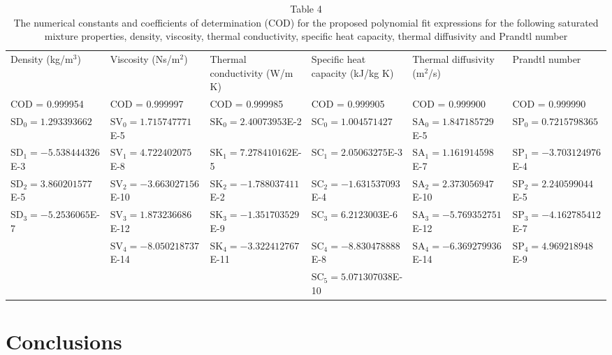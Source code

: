 \documentclass[11pt]{article}
\begin{document}
\begin{landscape}
\begin{table}[htbp]
\centering
\scriptsize
\caption*{Table 4\\ The numerical constants and coefficients of
determination (COD) for the proposed polynomial fit expressions for the
following saturated mixture properties, density, viscosity, thermal
conductivity, specific heat capacity, thermal diffusivity and Prandtl
number}
\setlength{\tabcolsep}{3pt}
\begin{tabular}{llllll}
\toprule
Density (kg/m$^3$) & Viscosity (Ns/m$^2$)
 & Thermal conductivity (W/m K) & Specific heat capacity (kJ/kg K)
 & Thermal diffusivity (m$^2$/s) & Prandtl number \\
COD = 0.999954 & COD = 0.999997 & COD = 0.999985
 & COD = 0.999905 & COD = 0.999900 & COD = 0.999990 \\
\midrule
$\mathrm{SD}_0 = 1.293393662$
 & $\mathrm{SV}_0 = 1.715747771$E-5
 & $\mathrm{SK}_0 = 2.40073953$E-2
 & $\mathrm{SC}_0 = 1.004571427$
 & $\mathrm{SA}_0 = 1.847185729$E-5
 & $\mathrm{SP}_0 = 0.7215798365$ \\
$\mathrm{SD}_1 = -5.538444326$E-3
 & $\mathrm{SV}_1 = 4.722402075$E-8
 & $\mathrm{SK}_1 = 7.278410162$E-5
 & $\mathrm{SC}_1 = 2.05063275$E-3
 & $\mathrm{SA}_1 = 1.161914598$E-7
 & $\mathrm{SP}_1 = -3.703124976$E-4 \\
$\mathrm{SD}_2 = 3.860201577$E-5
 & $\mathrm{SV}_2 = -3.663027156$E-10
 & $\mathrm{SK}_2 = -1.788037411$E-2
 & $\mathrm{SC}_2 = -1.631537093$E-4
 & $\mathrm{SA}_2 = 2.373056947$E-10
 & $\mathrm{SP}_2 = 2.240599044$E-5 \\
$\mathrm{SD}_3 = -5.2536065$E-7
 & $\mathrm{SV}_3 = 1.873236686$E-12
 & $\mathrm{SK}_3 = -1.351703529$E-9
 & $\mathrm{SC}_3 = 6.2123003$E-6
 & $\mathrm{SA}_3 = -5.769352751$E-12
 & $\mathrm{SP}_3 = -4.162785412$E-7 \\
 & $\mathrm{SV}_4 = -8.050218737$E-14
 & $\mathrm{SK}_4 = -3.322412767$E-11
 & $\mathrm{SC}_4 = -8.830478888$E-8
 & $\mathrm{SA}_4 = -6.369279936$E-14
 & $\mathrm{SP}_4 = 4.969218948$E-9 \\
 & & & $\mathrm{SC}_5 = 5.071307038$E-10 & & \\
\bottomrule
\end{tabular}
\end{table}
\end{landscape}

\section{Conclusions}
\end{document}
